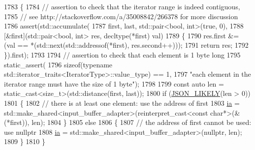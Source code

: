 \begin{DoxyCode}
1783     \{
1784         \textcolor{comment}{// assertion to check that the iterator range is indeed contiguous,}
1785         \textcolor{comment}{// see http://stackoverflow.com/a/35008842/266378 for more discussion}
1786         assert(std::accumulate(
1787                    first, last, std::pair<bool, int>(\textcolor{keyword}{true}, 0),
1788                    [&first](std::pair<bool, int> res, decltype(*first) val)
1789         \{
1790             res.first &= (val == *(std::next(std::addressof(*first), res.second++)));
1791             \textcolor{keywordflow}{return} res;
1792         \}).first);
1793 
1794         \textcolor{comment}{// assertion to check that each element is 1 byte long}
1795         static\_assert(
1796             \textcolor{keyword}{sizeof}(\textcolor{keyword}{typename} std::iterator\_traits<IteratorType>::value\_type) == 1,
1797             \textcolor{stringliteral}{"each element in the iterator range must have the size of 1 byte"});
1798 
1799         \textcolor{keyword}{const} \textcolor{keyword}{auto} len = \textcolor{keyword}{static\_cast<}\textcolor{keywordtype}{size\_t}\textcolor{keyword}{>}(std::distance(first, last));
1800         \textcolor{keywordflow}{if} (\hyperlink{json_8hpp_a41ecd1c4cf7c3d56477b9b685b5daa72}{JSON\_LIKELY}(len > 0))
1801         \{
1802             \textcolor{comment}{// there is at least one element: use the address of first}
1803             \hyperlink{classnlohmann_1_1detail_1_1input__adapter_ad5a11d0b65b68f6950cfbe8c8366b7da}{ia} = std::make\_shared<input\_buffer\_adapter>(\textcolor{keyword}{reinterpret\_cast<}\textcolor{keyword}{const }\textcolor{keywordtype}{char}*\textcolor{keyword}{>}(&(*first)), len);
1804         \}
1805         \textcolor{keywordflow}{else}
1806         \{
1807             \textcolor{comment}{// the address of first cannot be used: use nullptr}
1808             \hyperlink{classnlohmann_1_1detail_1_1input__adapter_ad5a11d0b65b68f6950cfbe8c8366b7da}{ia} = std::make\_shared<input\_buffer\_adapter>(\textcolor{keyword}{nullptr}, len);
1809         \}
1810     \}
\end{DoxyCode}
\mbox{\label{classnlohmann_1_1detail_1_1input__adapter_aa2392138bf8307df1994dc7eb22d51ce}} 
